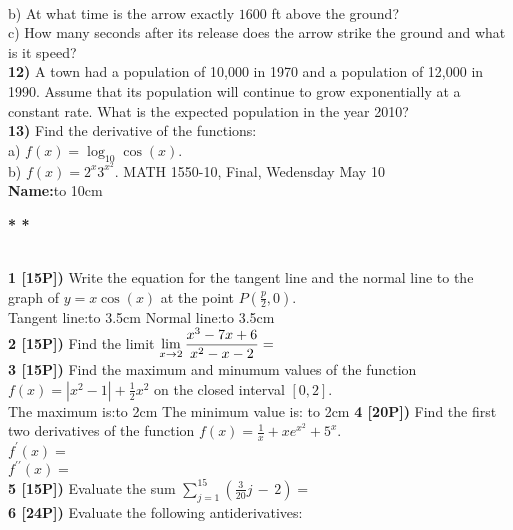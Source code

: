 \documentclass[12pt]{article}
\begin{document}
\\
b) At what time is the arrow exactly $1600$ ft above
the ground?
\\
c) How many seconds after its release does the arrow strike the
ground and what is it speed?
\\ %
{\bf 12)} A town had a population of 10,000 in 1970 and
a population of 12,000 in 1990. Assume that its population
will continue to grow exponentially at a constant
rate. What is the expected population in the year 2010?
\\ %
{\bf 13)} Find the derivative of the functions:
\\ %
a) $\displaystyle{f(x) = \log_{10} \cos (x)}$.
\\
b) $\displaystyle{f(x)= 2^x3^{x^2}}$.
MATH 1550-10, Final, Wedensday  May 10
\\ %
{\bf Name:}\hbox to 10cm{\hrulefill}
\\ %
\centerline{\Large\bf * * *}
\\ %
{\bf 1 [15P])} Write the equation for the tangent line and the
normal line to the graph of $\displaystyle{y = x \cos (x)}$
at the point $P(\frac{p}{2},0)$.
\\ %
Tangent line:\hbox to 3.5cm{\hrulefill}\hspace{1.5cm}
Normal line:\hbox to 3.5cm{\hrulefill}\hfill
\\ %
{\bf 2 [15P])}  Find the limit $\displaystyle{
\lim_{x\to 2}\frac{x^3 - 7x + 6}{x^2-x - 2}=\hrulefill}$
\\ %
{\bf 3 [15P])} Find the maximum and minumum values of
the function 
$\displaystyle{f(x) = |x^2-1| +\frac{1}{2}x^2}$ on the
closed interval $\displaystyle{[0,2]}$.
\\ %
The maximum is:\hbox to 2cm{\hrulefill}\hspace{1.5cm}
The minimum value is: \hbox to 2cm{\hrulefill}
{\bf 4 [20P])} Find the first two derivatives of the function
$\displaystyle{f(x) = \frac{1}{x} + xe^{x^2} + 5^x}$.
\\ %
$\displaystyle{f^\prime(x) = }$
\\ %
$\displaystyle{f^{\prime\prime}(x) = }$
\\ %
{\bf 5 [15P])} Evaluate the sum $ 
\displaystyle{\sum_{j=1}^{15}\left(
\frac{3}{20} j\,  -\, 2\right) = }$
\\ %
{\bf 6 [24P])}  Evaluate the following antiderivatives:
\\ %
\end{document}
